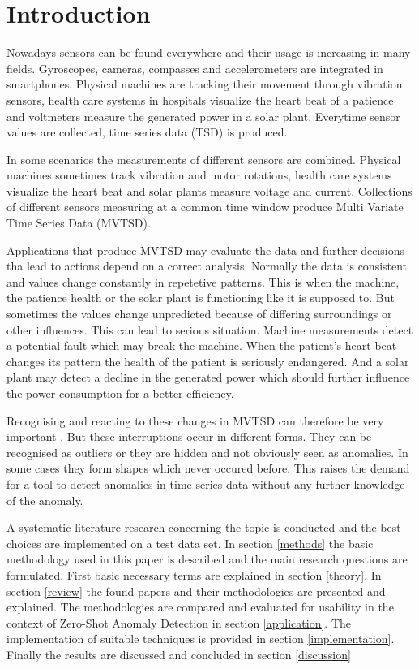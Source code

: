 \section{Introduction}\label{intro}
Nowadays sensors can be found everywhere and their usage is increasing in many fields. Gyroscopes, cameras, compasses and accelerometers are integrated in smartphones. Physical machines are tracking their movement through vibration sensors, health care systems in hospitals visualize the heart beat of a patience and voltmeters measure the generated power in a solar plant. Everytime sensor values are collected, time series data (TSD) is produced.

In some scenarios the measurements of different sensors are combined. Physical machines sometimes track vibration and motor rotations, health care systems visualize the heart beat and solar plants measure voltage and current.
Collections of different sensors measuring at a common time window produce Multi Variate Time Series Data (MVTSD).

Applications that produce MVTSD may evaluate the data and further decisions tha lead to actions depend on a correct analysis.
Normally the data is consistent and values change constantly in repetetive patterns. This is when the machine, the patience health or the solar plant is functioning like it is supposed to. But sometimes the values change unpredicted because of differing surroundings or other influences. This can lead to serious situation. Machine measurements detect a potential fault which may break the machine. When the patient's heart beat changes its pattern the health of the patient is seriously endangered. And a solar plant may detect a decline in the generated power which should further influence the power consumption for a better efficiency.

Recognising and reacting to these changes in MVTSD can therefore be very important%
. But these interruptions occur in different forms. They can be recognised as outliers or they are hidden and not obviously seen as anomalies. In some cases they form shapes which never occured before. This raises the demand for a tool to detect anomalies in time series data without any further knowledge of the anomaly.


A systematic literature research concerning the topic is conducted and the best choices are implemented on a test data set. In section \ref{methods} the basic methodology used in this paper is described and the main research questions are formulated. First basic necessary terms are explained in section \ref{theory}. In section \ref{review} the found papers and their methodologies are presented and explained. The methodologies are compared and evaluated for usability in the context of Zero-Shot Anomaly Detection in section \ref{application}. The implementation of suitable techniques is provided in section \ref{implementation}. Finally the results are discussed and concluded in section \ref{discussion}

